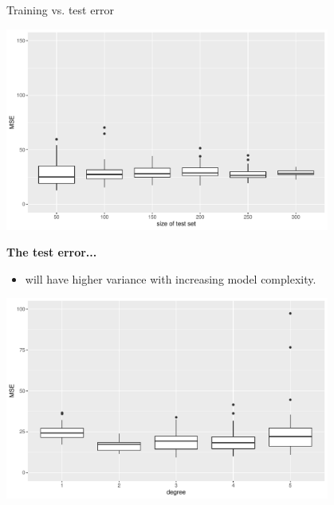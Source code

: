 \documentclass[11pt,compress,t,notes=noshow, xcolor=table]{beamer}
\begin{document}
\begin{vbframe}{Training vs. test error}
\begin{itemize}
\end{itemize}
\begin{center}
\includegraphics[width=0.8\textwidth]{figure/fig-train-vs-test-error-3}
\end{center}  

\framebreak
\textbf{The test error...}

\begin{itemize}    
  
  \item will have higher variance with increasing model complexity.
\end{itemize}

\begin{center}
\includegraphics[width=0.8\textwidth]{figure/fig-train-vs-test-error-5}
\end{center} 

\end{vbframe}


\end{document}
